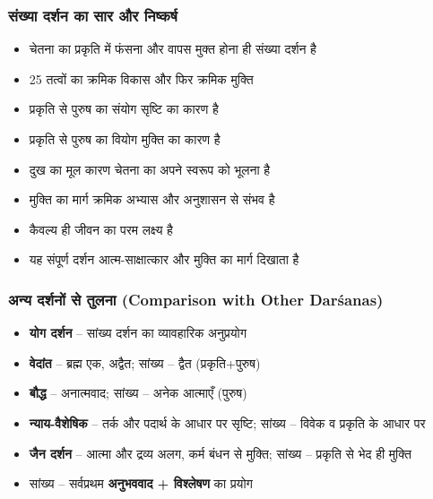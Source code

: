 \begin{frame}[fragile]\frametitle{संख्या दर्शन का सार और निष्कर्ष}
      \begin{itemize}
          \item चेतना का प्रकृति में फंसना और वापस मुक्त होना ही संख्या दर्शन है
          \item 25 तत्वों का क्रमिक विकास और फिर क्रमिक मुक्ति
          \item प्रकृति से पुरुष का संयोग सृष्टि का कारण है
          \item प्रकृति से पुरुष का वियोग मुक्ति का कारण है
          \item दुख का मूल कारण चेतना का अपने स्वरूप को भूलना है
          \item मुक्ति का मार्ग क्रमिक अभ्यास और अनुशासन से संभव है
          \item कैवल्य ही जीवन का परम लक्ष्य है
          \item यह संपूर्ण दर्शन आत्म-साक्षात्कार और मुक्ति का मार्ग दिखाता है
      \end{itemize}
\end{frame}

\begin{frame}[fragile]\frametitle{अन्य दर्शनों से तुलना (Comparison with Other Darśanas)}
\begin{itemize}
  \item \textbf{योग दर्शन} – सांख्य दर्शन का व्यावहारिक अनुप्रयोग
  \item \textbf{वेदांत} – ब्रह्म एक, अद्वैत; सांख्य – द्वैत (प्रकृति+पुरुष)
  \item \textbf{बौद्ध} – अनात्मवाद; सांख्य – अनेक आत्माएँ (पुरुष)
  \item \textbf{न्याय-वैशेषिक} – तर्क और पदार्थ के आधार पर सृष्टि; सांख्य – विवेक व प्रकृति के आधार पर
  \item \textbf{जैन दर्शन} – आत्मा और द्रव्य अलग, कर्म बंधन से मुक्ति; सांख्य – प्रकृति से भेद ही मुक्ति
  \item सांख्य – सर्वप्रथम \textbf{अनुभववाद + विश्लेषण} का प्रयोग
\end{itemize}
\end{frame}

